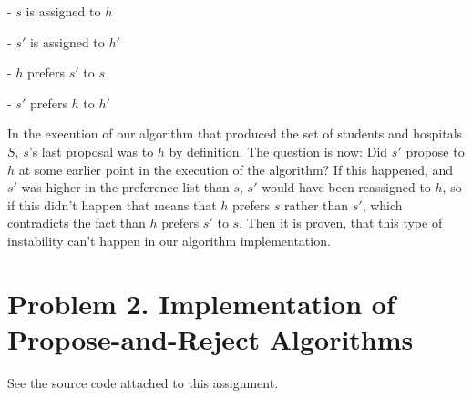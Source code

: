 \documentclass{article}
\begin{document}
- $s$ is assigned to $h$

- $s'$ is assigned to $h'$

- $h$ prefers $s'$ to $s$

- $s'$ prefers $h$ to $h'$

In the execution of our algorithm that produced the set of students and hospitals $S$, $s$'s last proposal was to $h$ by definition. The question is now: Did $s'$ propose to $h$ at some earlier point in the execution of the algorithm? If this happened, and $s'$ was higher in the preference list than $s$, $s'$ would have been reassigned to $h$, so if this didn't happen that means that $h$ prefers $s$ rather than $s'$, which contradicts the fact than $h$ prefers $s'$ to $s$. Then it is proven, that this type of instability can't happen in our algorithm implementation.

\section*{Problem 2. Implementation of Propose-and-Reject Algorithms}

See the source code attached to this assignment.
\end{document}
